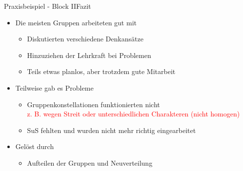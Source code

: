 \documentclass{beamer}
\newcommand{\teacher}[1]{\textcolor{red}{#1}}
\newcommand{\ppause}{}
\begin{document}
	\begin{frame}[t]{Praxisbeispiel - Block II}{Fazit}
		\begin{itemize}
			\ppause
			\item Die meisten Gruppen arbeiteten gut mit
			\ppause
			\begin{itemize}
				\item Diskutierten verschiedene Denkansätze
				\ppause
				\item Hinzuziehen der Lehrkraft bei Problemen
				\ppause
				\item Teils etwas planlos, aber trotzdem gute Mitarbeit
				\ppause
			\end{itemize}
			
			\item Teilweise gab es Probleme
			\ppause
			\begin{itemize}
				\item Gruppenkonstellationen funktionierten nicht\\
				\teacher{z. B. wegen Streit oder unterschiedlichen Charakteren (nicht homogen)}
				\ppause
				\item SuS fehlten und wurden nicht mehr richtig eingearbeitet
				\ppause
			\end{itemize}
			
			\item Gelöst durch
			\ppause
			\begin{itemize}
				\item Aufteilen der Gruppen und Neuverteilung
			\end{itemize}
		\end{itemize}
	\end{frame}
	
	
\end{document}
